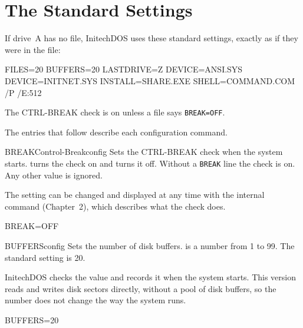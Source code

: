 \section{The Standard Settings}
If drive~A has no  file, InitechDOS uses these standard
settings, exactly as if they were in the file:
\begin{TypeIn}
FILES=20
BUFFERS=20
LASTDRIVE=Z
DEVICE=ANSI.SYS
DEVICE=INITNET.SYS
INSTALL=SHARE.EXE
SHELL=COMMAND.COM /P /E:512
\end{TypeIn}
The CTRL-BREAK check is on unless a  file says
\texttt{BREAK=OFF}.

The entries that follow describe each configuration command.

\begin{DosEntry}{BREAK}{Control-Break}{config}
\Purpose Sets the CTRL-BREAK check when the system starts.
\Format {}
\Remarks
{} turns the check on and  turns it off.  Without a
\texttt{BREAK} line the check is on.  Any other value is ignored.

The setting can be changed and displayed at any time with the internal
command  (Chapter~2), which describes what the check does.
\Example
\begin{TypeIn}
BREAK=OFF
\end{TypeIn}
\end{DosEntry}

\begin{DosEntry}{BUFFERS}{}{config}
\Purpose Sets the number of disk buffers.
\Format {}
\Remarks
{} is a number from 1 to 99.  The standard setting is 20.

InitechDOS checks the value and records it when the system starts.  This
version reads and writes disk sectors directly, without a pool of disk
buffers, so the number does not change the way the system runs.
\Example
\begin{TypeIn}
BUFFERS=20
\end{TypeIn}
\end{DosEntry}

